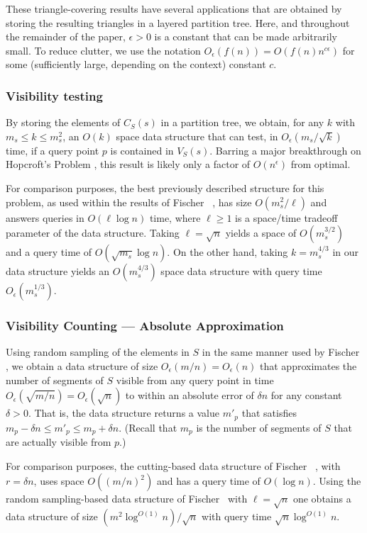 \documentclass{patmorin}
\newcommand{\Oe}{O_\epsilon}
\begin{document}
These triangle-covering results have several applications that are
obtained by storing the resulting triangles in a layered partition tree.
Here, and throughout the remainder of the paper, $\epsilon > 0$ is a
constant that can be made arbitrarily small. To reduce clutter, we use the
notation $\Oe(f(n))=O(f(n)n^{c\epsilon})$ for some (sufficiently large,
depending on the context) constant $c$.

\subsubsection{Visibility testing} 

By storing the elements of $C_S(s)$ in a partition tree, we obtain, for
any $k$ with $m_s\le k\le m_s^2$, an $O(k)$ space data structure that can
test, in $\Oe(m_s/\sqrt{k})$ time, if a query point $p$ is contained in
$V_S(s)$.  Barring a major breakthrough on Hopcroft's Problem \cite{e96},
this result is likely only a factor of $O(n^\epsilon)$ from optimal.

For comparison purposes, the best previously described structure
for this problem, as used within the results of Fischer \etal\
\cite{fhjmz08,fhjmz09}, has size $O(m_{s}^2/\ell)$ and answers queries
in $O(\ell\log n)$ time, where $\ell \ge 1$ is a space/time tradeoff
parameter of the data structure.  Taking $\ell=\sqrt{n}$ yields a space
of $O(m_s^{3/2})$ and a query time of $O(\sqrt{m_s}\log n)$.  On the other
hand, taking $k=m_s^{4/3}$ in our data structure yields an $O(m_s^{4/3})$
space data structure with query time $\Oe(m_s^{1/3})$.

\subsubsection{Visibility Counting --- Absolute Approximation}

Using random sampling of the elements in $S$ in the same manner used
by Fischer \etal, we obtain a data structure of size $\Oe(m/n)=\Oe(n)$
that approximates the number of segments of $S$ visible from any query
point in time $\Oe(\sqrt{m/n})=\Oe(\sqrt{n})$ to within an absolute
error of $\delta n$ for any constant $\delta > 0$.  That is, the data
structure returns a value $m'_p$ that satisfies $m_p -\delta n \le m'_p
\le m_p+\delta n$.  (Recall that $m_p$ is the number of segments of $S$
that are actually visible from $p$.)

For comparison purposes, the cutting-based data structure of Fischer
\etal\ \cite{fhjmz08,fhjmz09}, with $r=\delta n$, uses space $O((m/n)^2)$
and has a query time of $O(\log n)$.  Using the random sampling-based
data structure of Fischer \etal\ with $\ell=\sqrt{n}$ one obtains a
data structure of size $(m^2\log^{O(1)} n)/\sqrt{n}$ with query time
$\sqrt{n}\log^{O(1)} n$.
\end{document}
